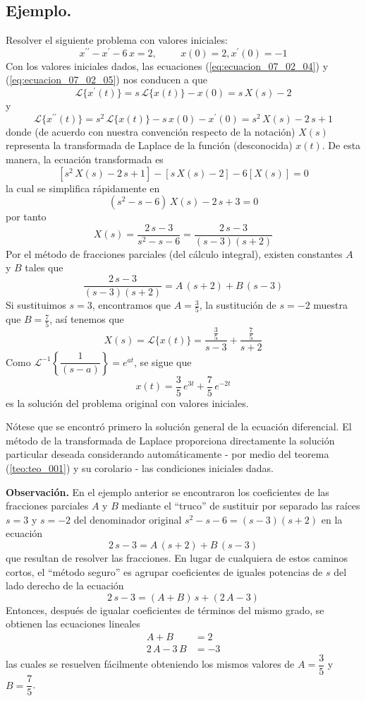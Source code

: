 \subsection*{Ejemplo.}
Resolver el siguiente problema con valores iniciales:
\[ x^{\prime \prime} - x^{\prime} - 6 \, x = 2, \hspace{1cm} x(0)=2, x^{\prime}(0) = -1 \]
Con los valores iniciales dados, las ecuaciones (\ref{eq:ecuacion_07_02_04}) y (\ref{eq:ecuacion_07_02_05}) nos conducen a que
\[ \mathscr{L} \{ x^{\prime}(t) \} = s \, \mathscr{L} \{ x(t) \} - x(0) =  s \, X(s) - 2  \]
y
\[ \mathscr{L} \{ x^{\prime \prime}(t) \} = s^{2} \, \mathscr{L} \{ x(t) \} - s \, x(0) - x^{\prime} (0) =  s^{2} \, X(s) - 2 \, s +1  \]
donde (de acuerdo con nuestra convención respecto de la notación) $X(s)$ representa la transformada de Laplace de la función (desconocida) $x(t)$. De esta manera, la ecuación transformada es
\[ [ s^{2} \, X(s) - 2 \, s + 1 ] - [ s \, X(s) - 2 ] - 6 [ X(s) ] = 0 \]
la cual se simplifica rápidamente en
\[ (s^{2} - s - 6) \, X(s) - 2 \, s + 3 = 0 \]
por tanto
\[ X(s) = \dfrac{2 \, s - 3}{s^{2} - s - 6} = \dfrac{2 \, s - 3}{(s-3)(s+2)} \]
Por el método de fracciones parciales (del cálculo integral), existen constantes $A$ y $B$ tales que
\[ \dfrac{2 \, s - 3}{(s-3)(s+2)} =  A \, (s + 2) + B \, (s -3) \]
Si sustituimos $s = 3$, encontramos que $A = \frac{3}{5}$, la sustitución de $s = -2$ muestra que $B = \frac{7}{5}$, así tenemos que
\[ X(s) = \mathscr{L} \{ x(t) \} = \dfrac{\frac{3}{5}}{s-3} + \dfrac{\frac{7}{5}}{s+2} \]
Como $\mathscr{L}^{-1} \left\{ \dfrac{1}{(s-a)} \right\} = e^{a t}$, se sigue que
\[ x(t) = \dfrac{3}{5} \, e^{3t} + \dfrac{7}{5} \, e^{-2t} \]
es la solución del problema original con valores iniciales. 
\par
Nótese que se encontró primero la solución general de la ecuación diferencial. El método de la transformada de Laplace proporciona directamente la solución particular deseada considerando automáticamente  - por medio del teorema (\ref{teo:teo_001}) y su corolario - las condiciones iniciales dadas.
\par
\textbf{Observación. } En el ejemplo anterior se encontraron los coeficientes de las fracciones parciales $A$ y $B$ mediante el \enquote{truco} de sustituir por separado las raíces $s = 3$ y $s = -2$ del denominador original $s^{2} - s - 6 = (s - 3)(s + 2)$ en la ecuación
\[ 2 \, s - 3 =  A \, (s+2) + B \, (s-3) \]
que resultan de resolver las fracciones. En lugar de cualquiera de estos caminos cortos, el \enquote{método seguro} es agrupar coeficientes de iguales potencias de $s$ del lado derecho de la ecuación
\[ 2 \, s - 3 = (A + B) \, s + (2 \, A - 3) \]
Entonces, después de igualar coeficientes de términos del mismo grado, se obtienen las ecuaciones lineales
\begin{align*}
A + B &= 2 \\
2 \, A - 3 \, B &= -3
\end{align*}
las cuales se resuelven fácilmente obteniendo los mismos valores de $A = \dfrac{3}{5}$ y $B = \dfrac{7}{5}$.
